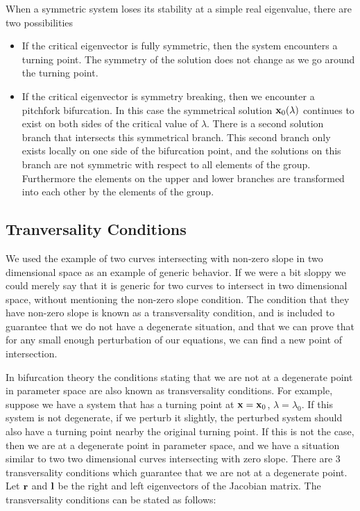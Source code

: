 When a symmetric system loses its stability at a simple real
eigenvalue, there are two possibilities


\begin{itemize}
\item  If the critical eigenvector is fully symmetric, then the
system encounters a turning point.  The symmetry of the 
solution does not change as we go around the turning point. 
\item  If the critical eigenvector is symmetry breaking, then 
we encounter a pitchfork bifurcation.  In this case the 
symmetrical solution ${\bf x}_0(\lambda)$ continues to exist on 
both sides of the critical value of $\lambda$.  There is a
second solution branch that intersects this symmetrical 
branch.  This second branch only exists locally on one side of the 
bifurcation point, and the solutions on this branch are not
symmetric with respect to all elements of the group.  
Furthermore the elements on the upper and lower branches are
transformed into each other by the elements of the
group.

\end{itemize}

\subsection{Tranversality Conditions}

We used the example of two curves intersecting with non-zero
slope in two 
dimensional space as an example of generic behavior.  
If we were a bit sloppy we could merely say that it is generic
for two curves to intersect in two dimensional space, without 
mentioning the non-zero slope condition.  The condition that
they have non-zero slope is known as a transversality 
condition, and is included to guarantee that we do not have a 
degenerate situation, and that we can prove that for any 
small enough perturbation of our equations, we can find a new
point of intersection.

In bifurcation theory the conditions stating that we are not at
a degenerate point in parameter space are also known as 
transversality conditions.  For example, suppose we 
have a system that has a turning point at ${\bf x}={\bf x}_0$, 
$\lambda = \lambda_0$.   If this system is not degenerate, if 
we perturb it slightly,  the perturbed system should 
also have a turning point nearby  the original turning point.
If this is not the case, then we are at a degenerate point
in parameter space, and we have a situation similar to 
two two dimensional curves intersecting with zero slope.
There are 3 transversality conditions which guarantee that we
are not at a degenerate point.
Let ${\bf r}$ and ${\bf l}$ be the right and left eigenvectors of the
Jacobian matrix.   The transversality conditions can be stated as 
follows:


